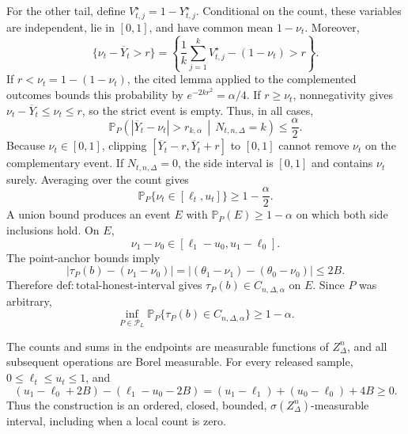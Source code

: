 For the other tail, define \(V_{t,j}^{\star}=1-Y_{t,j}^{\star}\).  Conditional on the count, these variables are independent, lie in \([0,1]\), and have common mean \(1-\nu_t\).  Moreover,
\[
 \{\nu_t-\overline Y_t>r\}
 =\left\{\frac1k\sum_{j=1}^kV_{t,j}^{\star}-(1-\nu_t)>r\right\}.
\]
If \(r<\nu_t=1-(1-\nu_t)\), the cited lemma applied to the complemented outcomes bounds this probability by \(e^{-2kr^2}=\alpha/4\).  If \(r\geq\nu_t\), nonnegativity gives \(\nu_t-\overline Y_t\leq\nu_t\leq r\), so the strict event is empty.  Thus, in all cases,
\[
 \mathbb P_P\!\left(|\overline Y_t-\nu_t|>r_{k,\alpha}\,\middle|\,N_{t,n,\Delta}=k\right)
 \leq\frac\alpha2.
\]
Because \(\nu_t\in[0,1]\), clipping \([\overline Y_t-r,\overline Y_t+r]\) to \([0,1]\) cannot remove \(\nu_t\) on the complementary event.  If \(N_{t,n,\Delta}=0\), the side interval is \([0,1]\) and contains \(\nu_t\) surely.  Averaging over the count gives
\[
 \mathbb P_P\{\nu_t\in[\ell_t,u_t]\}\geq1-\frac\alpha2.
\]
A union bound produces an event \(E\) with \(\mathbb P_P(E)\geq1-\alpha\) on which both side inclusions hold.  On \(E\),
\[
 \nu_1-\nu_0\in[\ell_1-u_0,u_1-\ell_0].
\]
The point-anchor bounds imply
\[
 |\tau_P(b)-(\nu_1-\nu_0)|
 =| (\theta_1-\nu_1)-(\theta_0-\nu_0)|
 \leq2B.
\]
Therefore \(\mathrm{def:total\text{-}honest\text{-}interval}\) gives \(\tau_P(b)\in C_{n,\Delta,\alpha}\) on \(E\).  Since \(P\) was arbitrary,
\[
 \inf_{P\in\mathcal P_L}\mathbb P_P\{\tau_P(b)\in C_{n,\Delta,\alpha}\}\geq1-\alpha.
\]

The counts and sums in the endpoints are measurable functions of \(Z_\Delta^n\), and all subsequent operations are Borel measurable.  For every released sample, \(0\leq\ell_t\leq u_t\leq1\), and
\[
 (u_1-\ell_0+2B)-(\ell_1-u_0-2B)
 =(u_1-\ell_1)+(u_0-\ell_0)+4B\geq0.
\]
Thus the construction is an ordered, closed, bounded, \(\sigma(Z_\Delta^n)\)-measurable interval, including when a local count is zero.

